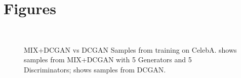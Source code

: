 \documentclass{article}
\begin{document}

\newpage
\section*{Figures}
    
\begin{figure}[!htb]%
  \centering
  \hspace{8pt}%
  \\
  \caption[Figure 1]{MIX+DCGAN vs DCGAN Samples from training on CelebA. 
     shows samples from MIX+DCGAN with 5 Generators and 5 Discriminators;  shows samples from DCGAN.
  }
  \label{fig:ex3}%
\end{figure}
\end{document}
